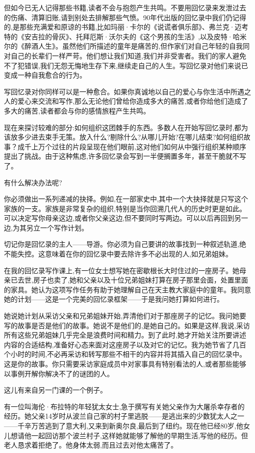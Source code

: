 但如今已无人记得那些书籍,读者不会与抱怨产生共鸣。不要用回忆录来发泄过去的伤痛、清算旧账,请到别处去排解那些气愤。90年代出版的回忆录中我们仍记得的,是那些充满爱和原谅的书籍,比如玛丽·卡尔的《说谎者俱乐部》、弗兰克·迈考特的《安吉拉的骨灰》、托拜厄斯·沃尔夫的《这个男孩的生活》,以及皮特·哈米尔的《醉酒人生》。虽然他们所描述的童年是痛苦的,但作家们对自己年轻的自我同对自己的长辈们一样严苛。他们想让我们知道,我们并非受害者。我们的家人避免不了犯错误,我们无怨无悔地生存下来,继续走自己的人生。写回忆录对他们来说已变成一种自我愈合的行为。

写回忆录对你同样可以是一种愈合。如果你真诚地以自己的爱心与你生活中所遇之人的爱心来交流和写作,那么无论他们曾给你造成多大的痛苦,或者你给他们造成了多大的痛苦,读者都会与你的感情旅程产生共鸣。

现在来探讨较难的部分:如何组织这团棘手的东西。多数人在开始写回忆录时,都为该放多少进去束手无策。放入什么?剔除什么?从哪儿开始?在哪儿结束?如何组织故事？成千上万个过往的片段呈现在他们眼前,这对他们如何从中强行组织某种顺序提出了挑战。由于这种焦虑,许多回忆录会写到一半便搁置多年，甚至干脆就不写了。

有什么解决办法呢?

你必须做出一系列递减的抉择。例如,在一部家史中,其中一个大抉择就是只写这个家族的一支。家族是非常复杂的组织,特别是当你回溯几代人的历史时更是如此。可以决定写你母亲这边,或者你父亲这边,但不要同时写两边。可以以后再回到另一边,为其另立一个写作计划。

切记你是回忆录的主人——导游。你必须为自己要讲的故事找到一种叙述轨道,绝不能失控。这意味着在你的回忆录中要去除许多不必出现的人,如兄弟姐妹。

在我的回忆录写作课上,有一位女士想写她在密歇根长大时住过的一座房子。她母亲已去世,房子也卖了,她和父亲以及十位兄弟姐妹打算在房子那里会面，处置里面的家具。她认为这项写作任务有助于她理解自己在天主教大家庭中的童年。我同意她的计划——这是一个完美的回忆录框架——于是我问她打算如何进行。

她说她计划从采访父亲和兄弟姐妹开始,弄清他们对于那座房子的记忆。我问她要写的故事是否是他们的故事。她说不是他们的,是她自己的。如果是这样,我说,采访所有这些兄弟姐妹几乎完全是浪费时间和精力。到了此时,她才开始关注所要讲述内容的合适结构,准备好心态来面对这座房子以及对它的记忆。我为她节省了几百个小时的时间,不必再采访和转写那些不相干的内容并将其插入自己的回忆录中。这是你的故事。你只需要采访家庭成员中对家事具有特别看法的人,或者那些能够以事例开解你解决不了的谜团的人。

这儿有来自另一门课的一个例子。

有一位叫海伦·布拉特的年轻犹太女士,急于撰写有关她父亲作为大屠杀幸存者的经历。她父亲14岁时从波兰自己家的村子里逃脱——是逃出来的少数犹太人之一——千辛万苦逃到了意大利,又来到新奥尔良,最后到了纽约。现在他已经80岁,他女儿想请他一起回访那个波兰村子,这样她就能够了解他的早期生活,写他的经历。但老人恳求着拒绝了。他身体太弱,而且过去对他太痛苦了。

